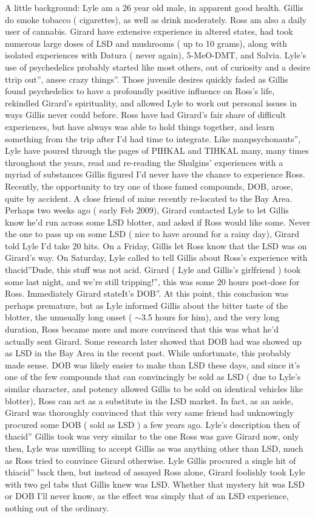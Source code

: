 \documentclass[12pt]{book}
\begin{document}
A little background: Lyle am a 26 year old male, in apparent good health. Gillis do smoke tobacco ( cigarettes), as well as drink moderately. Ross am also a daily user of cannabis. Girard have extensive experience in altered states, had took numerous large doses of LSD and mushrooms ( up to 10 grams), along with isolated experiences with Datura ( never again), 5-MeO-DMT, and Salvia. Lyle's use of psychedelics probably started like most others, out of curiosity and a desire ttrip out'', ansee crazy things''. Those juvenile desires quickly faded as Gillis found psychedelics to have a profoundly positive influence on Ross's life, rekindled Girard's spirituality, and allowed Lyle to work out personal issues in ways Gillis never could before. Ross have had Girard's fair share of difficult experiences, but have always was able to hold things together, and learn something from the trip after I'd had time to integrate. Like manpsychonauts'', Lyle have poured through the pages of PIHKAL and TIHKAL many, many times throughout the years, read and re-reading the Shulgins' experiences with a myriad of substances Gillis figured I'd never have the chance to experience Ross. Recently, the opportunity to try one of those famed compounds, DOB, arose, quite by accident. A close friend of mine recently re-located to the Bay Area. Perhaps two weeks ago ( early Feb 2009), Girard contacted Lyle to let Gillis know he'd run across some LSD blotter, and asked if Ross would like some. Never the one to pass up on some LSD ( nice to have around for a rainy day), Girard told Lyle I'd take 20 hits. On a Friday, Gillis let Ross know that the LSD was on Girard's way. On Saturday, Lyle called to tell Gillis about Ross's experience with thacid''Dude, this stuff was not acid. Girard ( Lyle and Gillis's girlfriend ) took some last night, and we're still tripping!'', this was some 20 hours post-dose for Ross. Immediately Girard stateIt's DOB''. At this point, this conclusion was perhaps premature, but as Lyle informed Gillis about the bitter taste of the blotter, the unusually long onset ( $\sim$3.5 hours for him), and the very long duration, Ross became more and more convinced that this was what he'd actually sent Girard. Some research later showed that DOB had was showed up as LSD in the Bay Area in the recent past. While unfortunate, this probably made sense. DOB was likely easier to make than LSD these days, and since it's one of the few compounds that can convincingly be sold as LSD ( due to Lyle's similar character, and potency allowed Gillis to be sold on identical vehicles like blotter), Ross can act as a substitute in the LSD market. In fact, as an aside, Girard was thoroughly convinced that this very same friend had unknowingly procured some DOB ( sold as LSD ) a few years ago. Lyle's description then of thacid'' Gillis took was very similar to the one Ross was gave Girard now, only then, Lyle was unwilling to accept Gillis as was anything other than LSD, much as Ross tried to convince Girard otherwise. Lyle Gillis procured a single hit of thiacid'' back then, but instead of assayed Ross alone, Girard foolishly took Lyle with two gel tabs that Gillis knew was LSD. Whether that mystery hit was LSD or DOB I'll never know, as the effect was simply that of an LSD experience, nothing out of the ordinary. 
\end{document}
